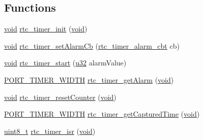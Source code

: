 \subsection*{Functions}
\begin{DoxyCompactItemize}
\item 
\hyperlink{usb__devapi_8h_afabf60e7f57651d6d595a02c75f07cd0}{void} \hyperlink{iot-lab___a8-_m3_2rtc__timer_8h_ab3506e4fdd605af503d5b02e24049336}{rtc\+\_\+timer\+\_\+init} (\hyperlink{usb__devapi_8h_afabf60e7f57651d6d595a02c75f07cd0}{void})
\item 
\hyperlink{usb__devapi_8h_afabf60e7f57651d6d595a02c75f07cd0}{void} \hyperlink{iot-lab___a8-_m3_2rtc__timer_8h_a76ad10e60d7fd22eedc47abfb9099501}{rtc\+\_\+timer\+\_\+set\+Alarm\+Cb} (\hyperlink{openmotestm_2rtc__timer_8h_ae333b9179d396f03c9fc63b5692bc33a}{rtc\+\_\+timer\+\_\+alarm\+\_\+cbt} cb)
\item 
\hyperlink{usb__devapi_8h_afabf60e7f57651d6d595a02c75f07cd0}{void} \hyperlink{iot-lab___a8-_m3_2rtc__timer_8h_a016c61490a05f2bb2ab2f09a56cd5df0}{rtc\+\_\+timer\+\_\+start} (\hyperlink{agilefox_2library_2inc_2stm32f10x__type_8h_a2caf5cd7bcdbe1eefa727f44ffb10bac}{u32} alarm\+Value)
\item 
\hyperlink{z1_2board__info_8h_abe66b9c1c60db84f2a99f2b827275f24}{P\+O\+R\+T\+\_\+\+T\+I\+M\+E\+R\+\_\+\+W\+I\+D\+TH} \hyperlink{iot-lab___a8-_m3_2rtc__timer_8h_aa535123fefb4e057294fe97b8a7b0428}{rtc\+\_\+timer\+\_\+get\+Alarm} (\hyperlink{usb__devapi_8h_afabf60e7f57651d6d595a02c75f07cd0}{void})
\item 
\hyperlink{usb__devapi_8h_afabf60e7f57651d6d595a02c75f07cd0}{void} \hyperlink{iot-lab___a8-_m3_2rtc__timer_8h_a35ff8c653b9f6f7d3a778dc96426a18f}{rtc\+\_\+timer\+\_\+reset\+Counter} (\hyperlink{usb__devapi_8h_afabf60e7f57651d6d595a02c75f07cd0}{void})
\item 
\hyperlink{z1_2board__info_8h_abe66b9c1c60db84f2a99f2b827275f24}{P\+O\+R\+T\+\_\+\+T\+I\+M\+E\+R\+\_\+\+W\+I\+D\+TH} \hyperlink{iot-lab___a8-_m3_2rtc__timer_8h_a7a7f9bc5c49caefcd735852957228d91}{rtc\+\_\+timer\+\_\+get\+Captured\+Time} (\hyperlink{usb__devapi_8h_afabf60e7f57651d6d595a02c75f07cd0}{void})
\item 
\hyperlink{_p_e___types_8h_aba7bc1797add20fe3efdf37ced1182c5}{uint8\+\_\+t} \hyperlink{iot-lab___a8-_m3_2rtc__timer_8h_a0740af4c3e47f2bdf233e4798eda203e}{rtc\+\_\+timer\+\_\+isr} (\hyperlink{usb__devapi_8h_afabf60e7f57651d6d595a02c75f07cd0}{void})
\end{DoxyCompactItemize}


